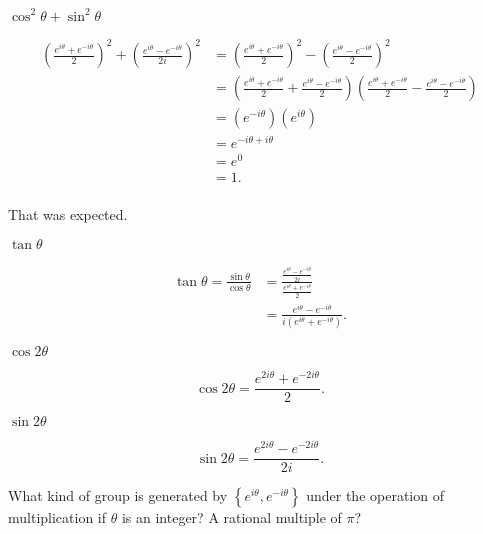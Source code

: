 \documentclass[../key.tex]{subfiles}
\begin{document}
\begin{inner_problem}[start=1]
\item $\cos^2\theta + \sin^2\theta$
\end{inner_problem}

\begin{align*}
\left(\frac{e^{i\theta} + e^{-i\theta}}{2}\right)^2 + \left(\frac{e^{i\theta} - e^{-i\theta}}{2i}\right)^2 &= \left(\frac{e^{i\theta} + e^{-i\theta}}{2}\right)^2 - \left(\frac{e^{i\theta} - e^{-i\theta}}{2}\right)^2 \\
&= \left(\frac{e^{i\theta} + e^{-i\theta}}{2} + \frac{e^{i\theta} - e^{-i\theta}}{2}\right)\left(\frac{e^{i\theta} + e^{-i\theta}}{2} - \frac{e^{i\theta} - e^{-i\theta}}{2}\right) \\
&= \left( e^{-i\theta} \right)\left( e^{i\theta} \right) \\
&= e^{-i\theta + i\theta} \\
&= e^0 \\
&= 1. \\
\end{align*}

That was expected.

\begin{inner_problem}
\item $\tan\theta$
\end{inner_problem}

\begin{align*}
\tan\theta = \frac{\sin\theta}{\cos\theta} &= \frac{\frac{e^{i\theta} - e^{-i\theta}}{2i}}{\frac{e^{i\theta} + e^{-i\theta}}{2}} \\
&= \frac{e^{i\theta} - e^{-i\theta}}{i(e^{i\theta}+e^{-i\theta})}.
\end{align*}

\begin{inner_problem}
\item $\cos 2\theta$
\end{inner_problem}

$$\cos 2\theta = \frac{e^{2i\theta} + e^{-2i\theta}}{2}.$$

\begin{inner_problem}
\item $\sin 2\theta$
\end{inner_problem}

$$\sin 2\theta = \frac{e^{2i\theta} - e^{-2i\theta}}{2i}.$$

\begin{inner_problem}
\item What kind of group is generated by $\left\{e^{i\theta}, e^{-i\theta}\right\}$ under the operation of multiplication if $\theta$ is an integer? A rational multiple of $\pi$?
\end{inner_problem}
\end{document}
